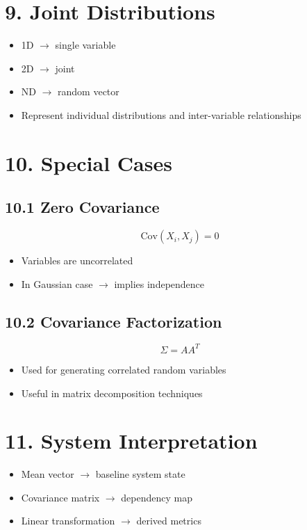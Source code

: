 \documentclass[12pt]{article}
\begin{document}
\section*{9. Joint Distributions}

\begin{itemize}
\item 1D $\rightarrow$ single variable
\item 2D $\rightarrow$ joint
\item ND $\rightarrow$ random vector
\item Represent individual distributions and inter-variable relationships
\end{itemize}

\section*{10. Special Cases}

\subsection*{10.1 Zero Covariance}

\[
\text{Cov}(X_i, X_j) = 0
\]

\begin{itemize}
\item Variables are uncorrelated
\item In Gaussian case $\rightarrow$ implies independence
\end{itemize}

\subsection*{10.2 Covariance Factorization}

\[
\Sigma = A A^T
\]

\begin{itemize}
\item Used for generating correlated random variables
\item Useful in matrix decomposition techniques
\end{itemize}

\section*{11. System Interpretation}

\begin{itemize}
\item Mean vector $\rightarrow$ baseline system state
\item Covariance matrix $\rightarrow$ dependency map
\item Linear transformation $\rightarrow$ derived metrics
\end{itemize}
\end{document}
